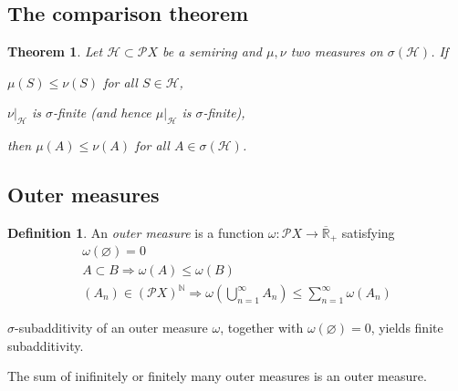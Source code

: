 \documentclass[11pt, a4paper, openany]{book}
\newtheorem{thm}{Theorem}\newtheorem{lem}{Lemma}\newtheorem{crl}{Corollary}
\theoremstyle{definition}
\newtheorem{define}{Definition}\newtheorem{exam}{Example}\newtheorem{remark}{Remark}
\newenvironment{tight_enumerate}{\begin{enumerate}\itemsep -0.2em}{\end{enumerate}}
\begin{document}
\subsection{The comparison theorem}
    \begin{thm}\label{comparison theorem}
        Let $\mathscr{H}\subset \mathscr{P}X$ be a semiring and $\mu,\nu$ two measures on $\sigma(\mathscr{H})$. If
        \begin{tight_enumerate}
            \item $\mu(S)\leqslant \nu(S)$ for all $S\in\mathscr{H}$,
            \item $\nu|_\mathscr{H}$ is $\sigma$-finite (and hence $\mu|_\mathscr{H}$ is $\sigma$-finite),
        \end{tight_enumerate}
        then $\mu(A)\leqslant\nu(A)$ for all $A\in\sigma(\mathscr{H})$.
    \end{thm}
\subsection{Outer measures}
    \begin{define}
        An \textit{outer measure} is a function $\omega:\mathscr{P}X\rightarrow \overline{\mathbb{R}}_+$ satisfying
        \begin{gather*}
            \omega(\varnothing)=0\\
            A\subset B\Longrightarrow \omega(A)\leqslant \omega(B)\\
            (A_n)\in (\mathscr{P}X)^\mathbb{N}\Longrightarrow  \omega\left(\bigcup_{n=1}^\infty A_n\right)\leqslant\sum_{n=1}^\infty\omega(A_n)
        \end{gather*}
    \end{define}
    $\sigma$-subadditivity of an outer measure $\omega$, together with $\omega(\varnothing)=0$, yields finite subadditivity.

    The sum of inifinitely or finitely many outer measures is an outer measure.
\end{document}
